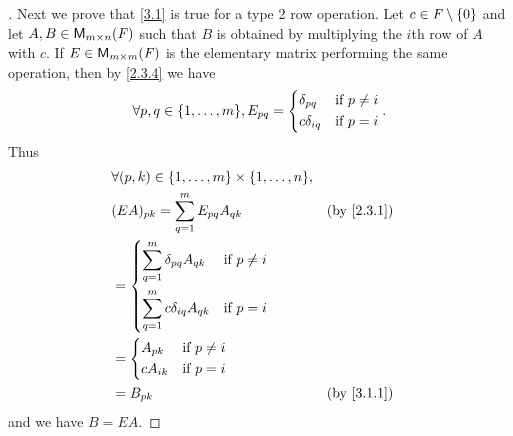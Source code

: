 \begin{proof}[]
	Next we prove that \cref{3.1} is true for a type 2 row operation.
	Let \(c \in \mathit{F} \setminus \left\lbrace0\right\rbrace\) and let \(A, B \in \MS\) such that \(B\) is obtained by multiplying the \(i\)th row of \(A\) with \(c\).
	If \(E \in \ms[m][m][\F]\) is the elementary matrix performing the same operation, then by \cref{2.3.4} we have
	\[
		\forall p, q \in \set{1, \dots, m}, E_{p q} = \begin{dcases}
			\delta_{p q}   & \text{if } p \neq i \\
			c \delta_{i q} & \text{if } p = i
		\end{dcases}.
	\]
	Thus
	\begin{align*}
		 & \forall (p, k) \in \set{1, \dots, m} \times \set{1, \dots, n},                 \\
		 & (EA)_{p k} = \sum_{q = 1}^m E_{p q} A_{q k}                    &  & \by{2.3.1} \\
		 & = \begin{dcases}
			     \sum_{q = 1}^m \delta_{p q} A_{q k}   & \text{if } p \neq i \\
			     \sum_{q = 1}^m c \delta_{i q} A_{q k} & \text{if } p = i
		     \end{dcases}                  \\
		 & = \begin{dcases}
			     A_{p k}   & \text{if } p \neq i \\
			     c A_{i k} & \text{if } p = i
		     \end{dcases}                                              \\
		 & = B_{p k}                                                      &  & \by{3.1.1}
	\end{align*}
	and we have \(B = EA\).


\end{proof}
